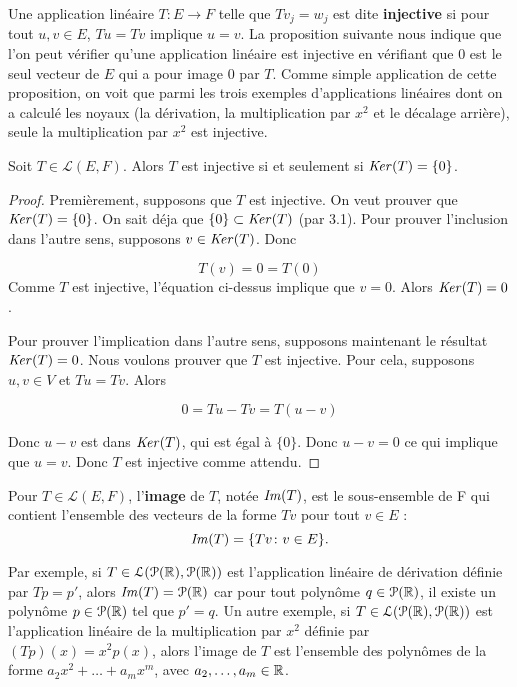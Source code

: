 \documentclass[12pt]{book}
\begin{document}
Une application linéaire $T\colon E \rightarrow F$ telle que $Tv_j=w_j$ est dite \textbf{injective} si pour tout $u,v\in E$, $Tu=Tv$ implique $u=v$. La proposition suivante nous indique que l'on peut vérifier qu'une application linéaire est injective en vérifiant que 0 est le seul vecteur de $E$ qui a pour image 0 par $T$. Comme simple application de cette proposition, on voit que parmi les trois exemples d'applications linéaires dont on a calculé les noyaux (la dérivation, la multiplication par $x^2$ et le décalage arrière), seule la multiplication par $x^2$ est injective.

\begin{prop}
Soit $T \in \mathcal{L}(E,F)$. Alors $T$ est injective si et seulement si $\textrm{\textit{Ker}}(T)= \{0\}$.
\end{prop}
\begin{proof}
Premièrement, supposons que $T$ est injective. On veut prouver que $\textrm{\textit{Ker}}(T)= \{0\}$. On sait déja que $\{0\}\subset\textrm{\textit{Ker}}(T)$ (par 3.1). Pour prouver l'inclusion dans l'autre sens, supposons $v \in \textrm{\textit{Ker}}(T)$. Donc 

\begin{equation*}
    T(v)=0=T(0)
\end{equation*}
Comme $T$ est injective, l'équation ci-dessus implique que $v=0$. Alors $\textrm{\textit{Ker}}(T)={0}$. 

Pour prouver l'implication dans l'autre sens, supposons maintenant le résultat $\textrm{\textit{Ker}}(T)=0$. Nous voulons prouver que $T$ est injective. Pour cela, supposons $u,v\in V$ et $Tu=Tv$. Alors 

\begin{equation*}
    0 = Tu - Tv = T(u-v)
\end{equation*}

Donc $u-v$ est dans $\textrm{\textit{Ker}}(T)$, qui est égal à $\{0\}$. Donc $u-v=0$ ce qui implique que $u=v$. Donc $T$ est injective comme attendu.
\end{proof}
Pour $T \in \mathcal{L}(E,F)$, l'\textbf{image} de $T$, notée $\textrm{\textit{Im}}(T)$, est le sous-ensemble de F qui contient l'ensemble des vecteurs de la forme $Tv$ pour tout $v\in E$ :
\begin{equation*}
    \textrm{\textit{Im}}(T) = \{Tv\colon v\in E\}.
\end{equation*}

Par exemple, si $T\in \mathcal{L}(\mathcal{P}(\mathbb{R}),\mathcal{P}(\mathbb{R}))$  est l'application linéaire de dérivation définie par $Tp=p'$, alors $\textrm{\textit{Im}}(T) = \mathcal{P}(\mathbb{R})$ car pour tout polynôme $q\in\mathcal{P}(\mathbb{R})$, il existe un polynôme $p\in\mathcal{P}(\mathbb{R})$ tel que $p'=q$.
Un autre exemple, si $T\in \mathcal{L}(\mathcal{P}(\mathbb{R}),\mathcal{P}(\mathbb{R}))$ est l'application linéaire de la multiplication par $x^2$ définie par $(Tp)(x)=x^2p(x)$, alors l'image de $T$ est l'ensemble des polynômes de la forme $a_2x^2+\ldots+a_mx^m$, avec $a_2,\ldots,a_m\in\mathbb{R}$.
\end{document}
